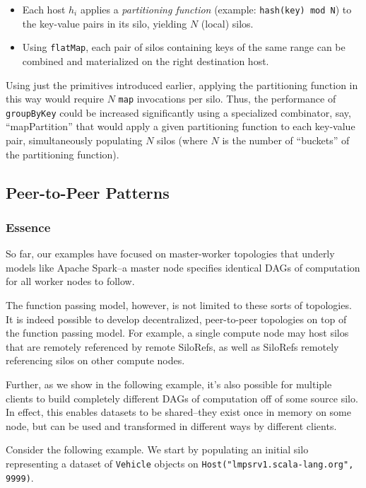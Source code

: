 \documentclass{jfp1}
\begin{document}
\begin{itemize}
  \item Each host $h_i$ applies a {\em partitioning function} (example:
    \texttt{hash(key) mod N}) to the key-value pairs in its silo, yielding $N$
    (local) silos.

  \item Using \verb|flatMap|, each pair of silos containing keys of the same
    range can be combined and materialized on the right destination host.
\end{itemize}

Using just the primitives introduced earlier, applying the partitioning function
in this way would require $N$ \verb|map| invocations per silo. Thus, the
performance of \verb|groupByKey| could be increased significantly using a
specialized combinator, say, ``mapPartition'' that would apply a given
partitioning function to each key-value pair, simultaneously populating $N$
silos (where $N$ is the number of ``buckets'' of the partitioning function).

\subsection{Peer-to-Peer Patterns}
\label{sec:decentral}

\subsubsection{Essence}

So far, our examples have focused on master-worker topologies that underly
models like Apache Spark--\ie a master node specifies identical DAGs of
computation for all worker nodes to follow.

The function passing model, however, is not limited to these sorts of
topologies. It is indeed possible to develop decentralized, peer-to-peer
topologies on top of the function passing model. For example, a single compute
node may host silos that are remotely referenced by remote SiloRefs, as well as
SiloRefs remotely referencing silos on other compute nodes.

Further, as we show in the following example, it's also possible for multiple
clients to build completely different DAGs of computation off of some source
silo. In effect, this enables datasets to be shared--they exist once in memory
on some node, but can be used and transformed in different ways by different
clients.

Consider the following example. We start by populating an initial silo
representing a dataset of \verb|Vehicle| objects on
\verb|Host("lmpsrv1.scala-lang.org", 9999)|.
\end{document}
